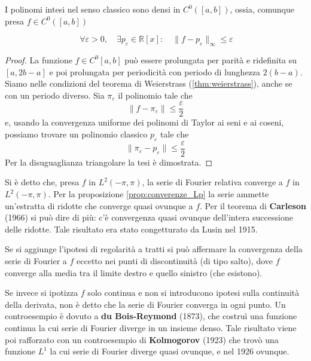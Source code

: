 \begin{theorem}\label{thm:stone_w}

I polinomi intesi nel senso classico sono densi in \(C^0([a, b])\), ossia, comunque 
presa \(f \in C^0([a, b])\)

\[\  \forall \varepsilon > 0, \quad \exists p_\varepsilon \in \mathbb R[x]: \quad 
    \| f - p_\varepsilon \|_{\infty} \le \varepsilon
\]
    
\end{theorem}

\begin{proof}
    La funzione \(f \in C^0[a, b]\) può essere prolungata per parità e
    ridefinita su \([a, 2b-a]\) e poi prolungata per periodicità con periodo di
    lunghezza \(2(b-a)\). Siamo nelle condizioni del teorema di Weierstrass
    (\ref{thm:weierstrass}), anche se con un periodo diverso. Sia
    \(\pi_\varepsilon\) il polinomio tale che 
    \[
    \| f- \pi_\varepsilon\| \leq \frac{\varepsilon}{2}
    \]
    e, usando la convergenza uniforme dei polinomi di Taylor ai seni e ai coseni, possiamo trovare un polinomio classico \(p_\varepsilon\) tale che
    \[
     \|\pi_\varepsilon - p_\varepsilon \| \leq \frac{\varepsilon}{2}
    \]
    Per la disuguaglianza triangolare la tesi è dimostrata. 
    
\end{proof}

Si è detto che, presa \(f\) in \(L^2(-\pi, \pi)\), la serie di Fourier relativa
converge a \(f\) in \(L^2(-\pi, \pi)\). Per la proposizione
\ref{prop:converenze_Lp} la serie ammette un'estratta di ridotte che converge
quasi ovunque a \(f\). Per il teorema di \textbf{Carleson} (1966) si può dire di
più: c'è convergenza quasi ovunque dell'intera successione delle ridotte. Tale
risultato era stato congetturato da Lusin nel 1915. 

Se si aggiunge l'ipotesi di regolarità a tratti si può affermare la convergenza
della serie di Fourier a \(f\) eccetto nei punti di discontinuità (di tipo
salto), dove \(f\) converge alla media tra il limite destro e quello sinistro
(che esistono). 

Se invece si ipotizza \(f\) solo continua e non si introducono ipotesi sulla
continuità della derivata, non è detto che la serie di Fourier converga in ogni
punto. Un controesempio è dovuto a \textbf{du Bois-Reymond} (1873), che
costruì una funzione continua la cui serie di Fourier diverge in un insieme
denso. Tale risultato viene poi rafforzato con un controesempio di
\textbf{Kolmogorov} (1923) che trovò una funzione \(L^1\) la cui serie di
Fourier diverge quasi ovunque, e nel 1926 ovunque. 

